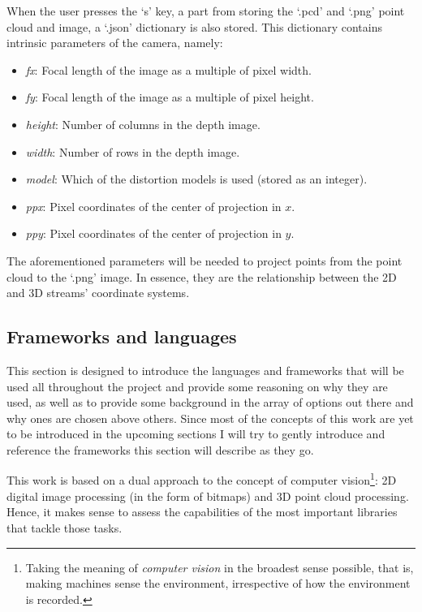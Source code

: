 \documentclass[../main.tex]{subfiles}
\begin{document}
When the user presses the `s' key, a part from storing the `.pcd' and `.png' point cloud and image, a `.json' dictionary is also stored. This dictionary contains intrinsic parameters of the camera, namely:
\begin{itemize}
    \item \emph{fx}: Focal length of the image as a multiple of pixel width.
    \item \emph{fy}: Focal length of the image as a multiple of pixel height.
    \item \emph{height}: Number of columns in the depth image.
    \item \emph{width}: Number of rows in the depth image.
    \item \emph{model}: Which of the distortion models is used (stored as an integer).
    \item \emph{ppx}: Pixel coordinates of the center of projection in $x$.
    \item \emph{ppy}: Pixel coordinates of the center of projection in $y$.
\end{itemize}
The aforementioned parameters will be needed to project points from the point cloud to the `.png' image. In essence, they are the relationship between the 2D and 3D streams' coordinate systems.

\subsection{Frameworks and languages}
This section is designed to introduce the languages and frameworks that will be used all throughout the project and provide some reasoning on why they are used, as well as to provide some background in the array of options out there and why ones are chosen above others. Since most of the concepts of this work are yet to be introduced in the upcoming sections I will try to gently introduce and reference the frameworks this section will describe as they go.

This work is based on a dual approach to the concept of computer vision\footnote{Taking the meaning of \emph{computer vision} in the broadest sense possible, that is, making machines sense the environment, irrespective of how the environment is recorded.}: 2D digital image processing (in the form of bitmaps) and 3D point cloud processing. Hence, it makes sense to assess the capabilities of the most important libraries that tackle those tasks.
\end{document}
